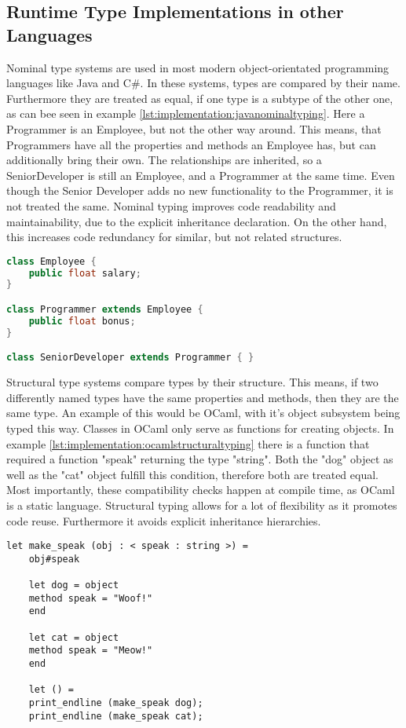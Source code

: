 \subsection{Runtime Type Implementations in other Languages}
\label{chap:runtime-other-languages}
Nominal type systems are used in most modern object-orientated programming languages like Java and C\#.  In these systems, types are compared by their name. Furthermore they are treated as equal, if one type is a subtype of the other one, as can bee seen in example \ref{lst:implementation:javanominaltyping}. Here a Programmer is an Employee, but not the other way around. This means, that Programmers have all the properties and methods an Employee has, but can additionally bring their own. The relationships are inherited, so a SeniorDeveloper is still an Employee, and a Programmer at the same time. Even though the Senior Developer adds no new functionality to the Programmer, it is not treated the same. Nominal typing improves code readability and maintainability, due to the explicit inheritance declaration. On the other hand, this increases code redundancy for similar, but not related structures.

\begin{lstlisting}[language=Java,caption=Example of nominal typing in java,label=lst:implementation:javanominaltyping]
class Employee {
	public float salary;
}

class Programmer extends Employee {
	public float bonus;
}

class SeniorDeveloper extends Programmer { }
\end{lstlisting}

Structural type systems compare types by their structure. This means, if two differently named types have the same properties and methods, then they are the same type. An example of this would be OCaml, with it's object subsystem being typed this way. Classes in OCaml only serve as functions for creating objects. In example \ref{lst:implementation:ocamlstructuraltyping} there is a function that required a function "speak" returning the type "string". Both the "dog" object as well as the "cat" object fulfill this condition, therefore both are treated equal. Most importantly, these compatibility checks happen at compile time, as OCaml is a static language. Structural typing allows for a lot of flexibility as it promotes code reuse. Furthermore it avoids explicit inheritance hierarchies.

\begin{lstlisting}[language=caml,caption=Example of structural typing in Ocaml,label=lst:implementation:ocamlstructuraltyping]
	let make_speak (obj : < speak : string >) =
	obj#speak
	
	let dog = object
	method speak = "Woof!"
	end
	
	let cat = object
	method speak = "Meow!"
	end
	
	let () =
	print_endline (make_speak dog);
	print_endline (make_speak cat);
\end{lstlisting}

